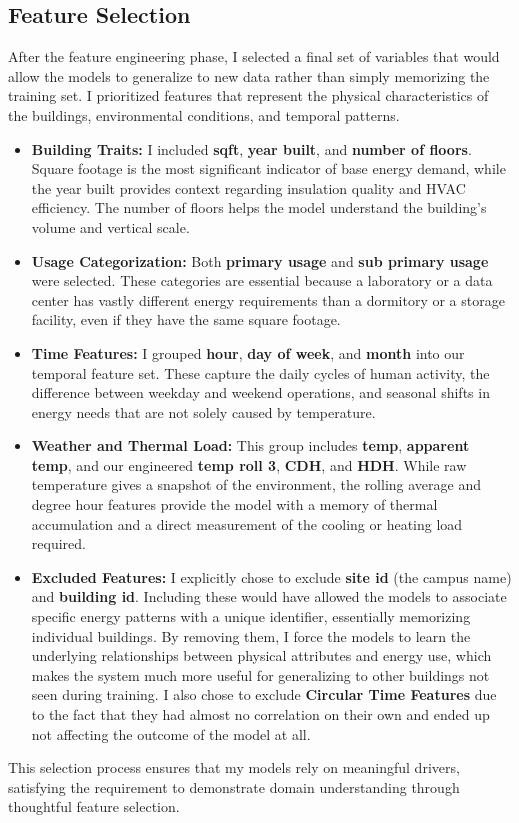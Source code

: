 \documentclass[conference]{IEEEtran}
\begin{document}
\subsection{Feature Selection}
After the feature engineering phase, I selected a final set of variables that would allow the models to generalize to new data rather than simply memorizing the training set. I prioritized features that represent the physical characteristics of the buildings, environmental conditions, and temporal patterns.
\begin{itemize} 
\item \textbf{Building Traits:} I included \textbf{sqft}, \textbf{year built}, and \textbf{number of floors}. Square footage is the most significant indicator of base energy demand, while the year built provides context regarding insulation quality and HVAC efficiency. The number of floors helps the model understand the building's volume and vertical scale. 
\item \textbf{Usage Categorization:} Both \textbf{primary usage} and \textbf{sub primary usage} were selected. These categories are essential because a laboratory or a data center has vastly different energy requirements than a dormitory or a storage facility, even if they have the same square footage. 
\item \textbf{Time Features:} I grouped \textbf{hour}, \textbf{day of week}, and \textbf{month} into our temporal feature set. These capture the daily cycles of human activity, the difference between weekday and weekend operations, and seasonal shifts in energy needs that are not solely caused by temperature. 
\item \textbf{Weather and Thermal Load:} This group includes \textbf{temp}, \textbf{apparent temp}, and our engineered \textbf{temp roll 3}, \textbf{CDH}, and \textbf{HDH}. While raw temperature gives a snapshot of the environment, the rolling average and degree hour features provide the model with a memory of thermal accumulation and a direct measurement of the cooling or heating load required.
\item \textbf{Excluded Features:} I explicitly chose to exclude \textbf{site id} (the campus name) and \textbf{building id}. Including these would have allowed the models to associate specific energy patterns with a unique identifier, essentially memorizing individual buildings. By removing them, I force the models to learn the underlying relationships between physical attributes and energy use, which makes the system much more useful for generalizing to other buildings not seen during training. I also chose to exclude \textbf{Circular Time Features} due to the fact that they had almost no correlation on their own and ended up not affecting the outcome of the model at all.
\end{itemize} 
This selection process ensures that my models rely on meaningful drivers, satisfying the requirement to demonstrate domain understanding through thoughtful feature selection. 
\end{document}

